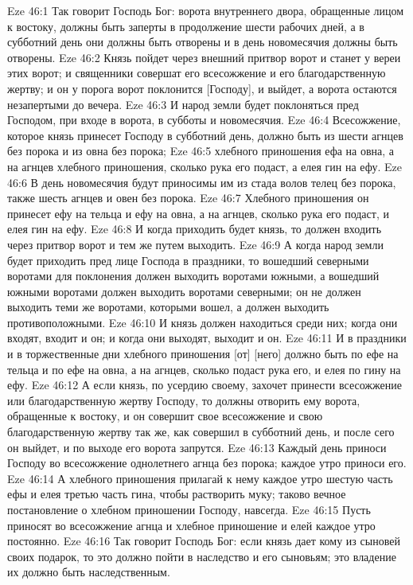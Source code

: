 Eze 46:1  Так говорит Господь Бог: ворота внутреннего двора, обращенные лицом к востоку, должны быть заперты в продолжение шести рабочих дней, а в субботний день они должны быть отворены и в день новомесячия должны быть отворены.
Eze 46:2  Князь пойдет через внешний притвор ворот и станет у вереи этих ворот; и священники совершат его всесожжение и его благодарственную жертву; и он у порога ворот поклонится [Господу], и выйдет, а ворота остаются незапертыми до вечера.
Eze 46:3  И народ земли будет поклоняться пред Господом, при входе в ворота, в субботы и новомесячия.
Eze 46:4  Всесожжение, которое князь принесет Господу в субботний день, должно быть из шести агнцев без порока и из овна без порока;
Eze 46:5  хлебного приношения ефа на овна, а на агнцев хлебного приношения, сколько рука его подаст, а елея гин на ефу.
Eze 46:6  В день новомесячия будут приносимы им из стада волов телец без порока, также шесть агнцев и овен без порока.
Eze 46:7  Хлебного приношения он принесет ефу на тельца и ефу на овна, а на агнцев, сколько рука его подаст, и елея гин на ефу.
Eze 46:8  И когда приходить будет князь, то должен входить через притвор ворот и тем же путем выходить.
Eze 46:9  А когда народ земли будет приходить пред лице Господа в праздники, то вошедший северными воротами для поклонения должен выходить воротами южными, а вошедший южными воротами должен выходить воротами северными; он не должен выходить теми же воротами, которыми вошел, а должен выходить противоположными.
Eze 46:10  И князь должен находиться среди них; когда они входят, входит и он; и когда они выходят, выходит и он.
Eze 46:11  И в праздники и в торжественные дни хлебного приношения [от] [него] должно быть по ефе на тельца и по ефе на овна, а на агнцев, сколько подаст рука его, и елея по гину на ефу.
Eze 46:12  А если князь, по усердию своему, захочет принести всесожжение или благодарственную жертву Господу, то должны отворить ему ворота, обращенные к востоку, и он совершит свое всесожжение и свою благодарственную жертву так же, как совершил в субботний день, и после сего он выйдет, и по выходе его ворота запрутся.
Eze 46:13  Каждый день приноси Господу во всесожжение однолетнего агнца без порока; каждое утро приноси его.
Eze 46:14  А хлебного приношения прилагай к нему каждое утро шестую часть ефы и елея третью часть гина, чтобы растворить муку; таково вечное постановление о хлебном приношении Господу, навсегда.
Eze 46:15  Пусть приносят во всесожжение агнца и хлебное приношение и елей каждое утро постоянно.
Eze 46:16  Так говорит Господь Бог: если князь дает кому из сыновей своих подарок, то это должно пойти в наследство и его сыновьям; это владение их должно быть наследственным.

